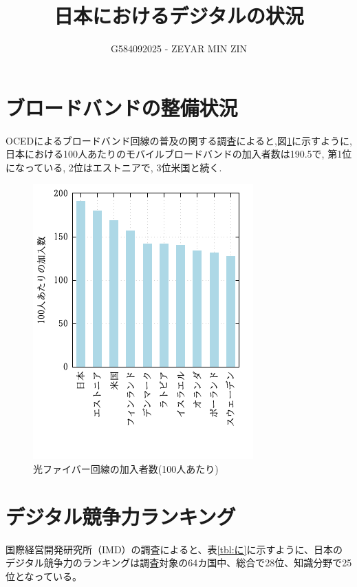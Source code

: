 \documentclass[a4paper,11pt,dvipdfmx]{ujarticle}
\title{日本におけるデジタルの状況}
\author{G584092025 - ZEYAR MIN ZIN}
\begin{document}
\maketitle

\section{ブロードバンドの整備状況}

OCEDによるブロードバンド回線の普及の関する調査\cite{oecd}によると,図\ref{fig:いち}に示すように, 日本における100人あたりのモバイルブロードバンドの加入者数は190.5で, 第1位になっている, 2位はエストニアで, 3位米国と続く.

\begin{figure}[htbp]
    \centering
    \includegraphics[scale=0.8]{fig21.png}
    \caption{光ファイバー回線の加入者数(100人あたり)}\label{fig:いち}
\end{figure}

\newpage
\section{デジタル競争力ランキング}

国際経営開発研究所（IMD）の調査\cite{imd}によると、表\ref{tbl:に}に示すように、日本のデジタル競争力のランキングは調査対象の64カ国中、総合で28位、知識分野で25位となっている。
\end{document}
